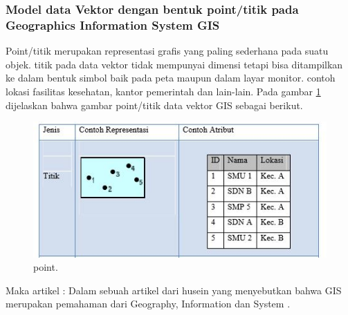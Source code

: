 \begin{enumerate}
\subsubsection{Model data Vektor dengan bentuk point/titik pada Geographics Information System GIS}
Point/titik merupakan representasi grafis yang paling sederhana pada suatu objek. titik pada data vektor tidak mempunyai dimensi tetapi bisa ditampilkan ke dalam bentuk simbol baik pada peta maupun dalam layar monitor. contoh  lokasi fasilitas kesehatan, kantor pemerintah dan lain-lain.
Pada gambar \ref{point} dijelaskan bahwa gambar point/titik data vektor GIS sebagai berikut.
\begin{figure}[ht]
	\centerline{\includegraphics[width=1\textwidth]{figures/point.JPG}}
	\caption{point.}
	\label{point}
	\end{figure}

Maka artikel :
	Dalam sebuah artikel dari husein yang menyebutkan bahwa  GIS merupakan pemahaman dari
	Geography, Information dan System \cite{widiatmoko2009aplikasi}.


\end{enumerate}
